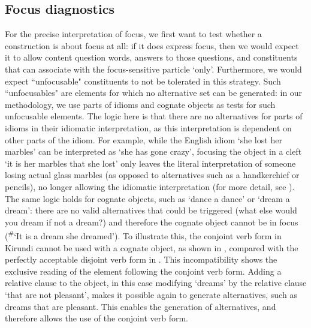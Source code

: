 \documentclass[output=paper]{langscibook}
\begin{document}
\subsection{Focus diagnostics}
\label{bkm:Ref131673501}
\largerpage
For the precise interpretation of focus, we first want to test whether a construction is about focus at all: if it does express focus, then we would expect it to allow content question words, answers to those questions, and constituents that can associate with the focus-sensitive particle ‘only’. Furthermore, we would expect ``unfocusable" constituents to not be tolerated in this strategy. Such ``unfocusables" are elements for which no alternative set can be generated: in our methodology, we use parts of idioms and cognate objects as tests for such unfocusable elements. The logic here is that there are no alternatives for parts of idioms in their idiomatic interpretation, as this interpretation is dependent on other parts of the idiom. For example, while the English idiom ‘she lost her marbles’ can be interpreted as ‘she has gone crazy’, focusing the object in a cleft ‘it is her marbles that she lost’ only leaves the literal interpretation of someone losing actual glass marbles (as opposed to alternatives such as a handkerchief or pencils), no longer allowing the idiomatic interpretation (for more detail, see \citealt{vanderWal2021}). The same logic holds for cognate objects, such as ‘dance a dance’ or ‘dream a dream’: there are no valid alternatives that could be triggered (what else would you dream if not a dream?) and therefore the cognate object cannot be in focus (\textsuperscript{\#}`It is a dream she dreamed’). To illustrate this, the conjoint verb form in Kirundi cannot be used with a cognate object, as shown in , compared with the perfectly acceptable disjoint verb form in . This incompatibility shows the exclusive reading of the element following the conjoint verb form. Adding a relative clause to the object, in this case modifying ‘dreams’ by the relative clause ‘that are not pleasant’, makes it possible again to generate alternatives, such as dreams that are pleasant. This enables the generation of alternatives, and therefore allows the use of the conjoint verb form.
\end{document}
